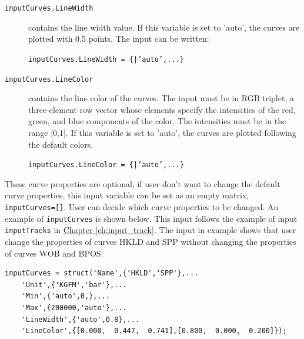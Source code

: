 \documentclass[12pt,a4paper,oneside]{report}
\begin{document}
\begin{description}
\item[\texttt{inputCurves.LineWidth}] contains the line width value. If this variable is set to 'auto', the curves are plotted with 0.5 points. The input can be written:

\texttt{inputCurves.LineWidth = \{<numeric value>|'auto',...\}}

\item[\texttt{inputCurves.LineColor}] contains the line color of the curves. The input must be in RGB triplet, a three-element row vector whose elements specify the intensities of the red, green, and blue components of the color. The intensities must be in the range [0,1]. If this variable is set to 'auto', the curves are plotted following the default colors.

\texttt{inputCurves.LineColor = \{<RGB triplet>|'auto',...\}}

\end{description}

These curve properties are optional, if user don't want to change the default curve properties, this input variable can be set as an empty matrix, \texttt{inputCurves=[]}. User can decide which curve properties to be changed. An example of \texttt{inputCurves} is shown below. This input follows the example of input \texttt{inputTracks} in \hyperref[ch:input_track]{Chapter \ref{ch:input_track}}. The input in example shows that user change the properties of curves HKLD and SPP without changing the properties of curves WOB and BPOS.
\begin{lstlisting}[style=Matlab-editor]
inputCurves = struct('Name',{'HKLD','SPP'},...
    'Unit',{'KGFM','bar'},...
    'Min',{'auto',0,},...
    'Max',{200000,'auto'},...
    'LineWidth',{'auto',0.8},...
    'LineColor',{[0.000,  0.447,  0.741],[0.800,  0.000,  0.200]});
\end{lstlisting}
\end{document}
